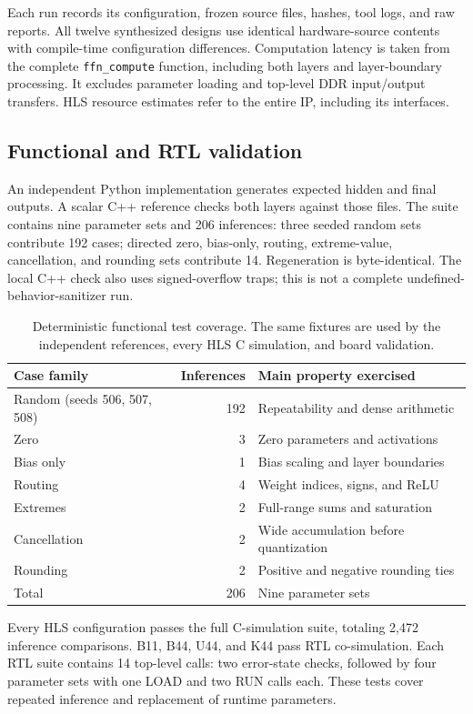 \documentclass[11pt,letterpaper]{article}
\DeclareRobustCommand{\code}[1]{\nolinkurl{#1}}
\begin{document}
Each run records its configuration, frozen source files, hashes, tool logs, and
raw reports. All twelve synthesized designs use identical hardware-source
contents with compile-time configuration differences. Computation latency is
taken from the complete \code{ffn_compute} function, including both layers and
layer-boundary processing. It excludes parameter loading and top-level DDR
input/output transfers. HLS resource estimates refer to the entire IP,
including its interfaces.

\subsection{Functional and RTL validation}
An independent Python implementation generates expected hidden and final
outputs. A scalar C++ reference checks both layers against those files. The
suite contains nine parameter sets and 206 inferences: three seeded random
sets contribute 192 cases; directed zero, bias-only, routing, extreme-value,
cancellation, and rounding sets contribute 14. Regeneration is byte-identical.
The local C++ check also uses signed-overflow traps; this is not a complete
undefined-behavior-sanitizer run.

\begin{table}[tb]
\centering
\small
\caption{Deterministic functional test coverage. The same fixtures are used by
the independent references, every HLS C simulation, and board validation.}
\label{tab:coverage}
\begin{tabular}{lrl}
\toprule
Case family & Inferences & Main property exercised\\
\midrule
Random (seeds 506, 507, 508) & 192 & Repeatability and dense arithmetic\\
Zero & 3 & Zero parameters and activations\\
Bias only & 1 & Bias scaling and layer boundaries\\
Routing & 4 & Weight indices, signs, and ReLU\\
Extremes & 2 & Full-range sums and saturation\\
Cancellation & 2 & Wide accumulation before quantization\\
Rounding & 2 & Positive and negative rounding ties\\
\midrule
Total & 206 & Nine parameter sets\\
\bottomrule
\end{tabular}
\end{table}

Every HLS configuration passes the full C-simulation suite, totaling 2,472
inference comparisons. B11, B44, U44, and K44 pass RTL co-simulation. Each RTL
suite contains 14 top-level calls: two error-state checks, followed by four
parameter sets with one LOAD and two RUN calls each. These tests cover repeated
inference and replacement of runtime parameters.
\end{document}
